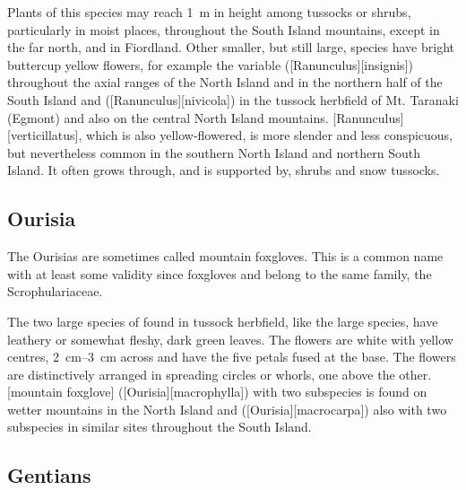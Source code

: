 Plants of this species may reach \SI{1}{\metre} in height among tussocks or shrubs, particularly in moist places, throughout the South Island mountains, except in the far north, and in Fiordland.
Other smaller, but still large, species have bright buttercup yellow flowers, for example the variable  ([Ranunculus][insignis]) throughout the axial ranges of the North Island and in the northern half of the South Island and  ([Ranunculus][nivicola]) in the tussock herbfield of Mt. Taranaki (Egmont) and also on the central North Island mountains. [Ranunculus][verticillatus], which is also yellow-flowered, is more slender and less conspicuous, but nevertheless common in the southern North Island and northern South Island.
It often grows through, and is supported by, shrubs and snow tussocks.

\subsection{Ourisia}

The Ourisias are sometimes called mountain foxgloves.
This is a common name with at least some validity since foxgloves and  belong to the same family, the Scrophulariaceae.

The two large species of  found in tussock herbfield, like the large  species, have leathery or somewhat fleshy, dark green leaves.
The flowers are white with yellow centres, \SIrange{2}{3}{\centi\metre} across and have the five petals fused at the base.
The flowers are distinctively arranged in spreading circles or whorls, one above the other. [mountain foxglove] ([Ourisia][macrophylla]) with two subspecies is found on wetter mountains in the North Island and  ([Ourisia][macrocarpa]) also with two subspecies in similar sites throughout the South Island.

\subsection{Gentians}

